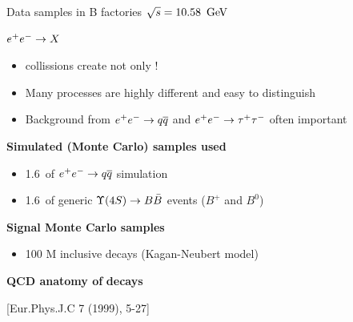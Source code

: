 \documentclass[xcolor=dvipsnames]{beamer}
\begin{document}
   \begin{frame}{Data samples in B factories}
      \scriptsize\centering
      \textbf{$\sqrt{s} = 10.58~\mathrm{\,Ge\kern -0.1em V}$} 
      
      $e^+e^-\rightarrow X$

      \vspace{10pt}

      \begin{itemize}
         \item \epem collissions create not only \FourS!
         \item Many processes are highly different and easy to distinguish
         \item Background from $e^+e^-\rightarrow q\overline q$ and $e^+e^-\rightarrow\tau^+\tau^-$ often important
      \end{itemize}
   \begin{flushleft}
   \textbf{Simulated (Monte Carlo) samples used}
   \end{flushleft}
   \begin{itemize}
      \vspace{-5pt}
      \item 1.6~\invab of $e^+e^-\rightarrow q\overline q$ simulation
      \item 1.6~\invab of generic $\FourS\ra B\bar{B}$ events ($B^+$ and $B^0$)
   \end{itemize}
   \begin{flushleft}
   \textbf{Signal Monte Carlo samples}
   \end{flushleft}
   \begin{itemize}
      \vspace{-5pt}
      \item 100 M inclusive \BtoXsgamma decays (Kagan-Neubert model) 
   \end{itemize}
   \begin{flushright}
      \tiny
      \textbf{QCD anatomy of}  \textbf{decays}
       
      [Eur.Phys.J.C 7 (1999), 5-27]
   \end{flushright}
      
   \end{frame}
\end{document}
